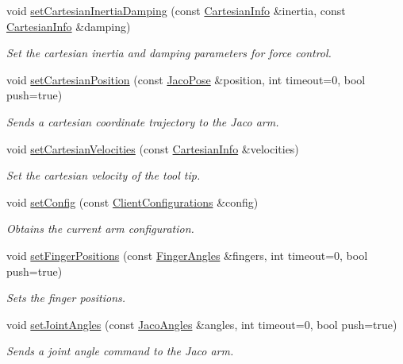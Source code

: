 \begin{DoxyCompactItemize}
void \hyperlink{classjaco_1_1JacoComm_afbb443b8e3fe71ef58b0013fdb3d5674}{set\+Cartesian\+Inertia\+Damping} (const \hyperlink{structCartesianInfo}{Cartesian\+Info} \&inertia, const \hyperlink{structCartesianInfo}{Cartesian\+Info} \&damping)
\begin{DoxyCompactList}\small\item\em Set the cartesian inertia and damping parameters for force control. \end{DoxyCompactList}\item 
void \hyperlink{classjaco_1_1JacoComm_a7a7375d2609c81f0a03974b06ca07be0}{set\+Cartesian\+Position} (const \hyperlink{classjaco_1_1JacoPose}{Jaco\+Pose} \&position, int timeout=0, bool push=true)
\begin{DoxyCompactList}\small\item\em Sends a cartesian coordinate trajectory to the Jaco arm. \end{DoxyCompactList}\item 
void \hyperlink{classjaco_1_1JacoComm_a468352480a437cc2144c8d4d289815a5}{set\+Cartesian\+Velocities} (const \hyperlink{structCartesianInfo}{Cartesian\+Info} \&velocities)
\begin{DoxyCompactList}\small\item\em Set the cartesian velocity of the tool tip. \end{DoxyCompactList}\item 
void \hyperlink{classjaco_1_1JacoComm_ae7901b1dff2e84eb89256f46a7c65b62}{set\+Config} (const \hyperlink{KinovaTypes_8h_d1/d2e/structClientConfigurations}{Client\+Configurations} \&config)
\begin{DoxyCompactList}\small\item\em Obtains the current arm configuration. \end{DoxyCompactList}\item 
void \hyperlink{classjaco_1_1JacoComm_a5cdc217373b923f7de2ed468150281fa}{set\+Finger\+Positions} (const \hyperlink{classjaco_1_1FingerAngles}{Finger\+Angles} \&fingers, int timeout=0, bool push=true)
\begin{DoxyCompactList}\small\item\em Sets the finger positions. \end{DoxyCompactList}\item 
void \hyperlink{classjaco_1_1JacoComm_ad53fa0c190d41da8430de2e9bf997f05}{set\+Joint\+Angles} (const \hyperlink{classjaco_1_1JacoAngles}{Jaco\+Angles} \&angles, int timeout=0, bool push=true)
\begin{DoxyCompactList}\small\item\em Sends a joint angle command to the Jaco arm. \end{DoxyCompactList}\item 

\end{DoxyCompactItemize}
